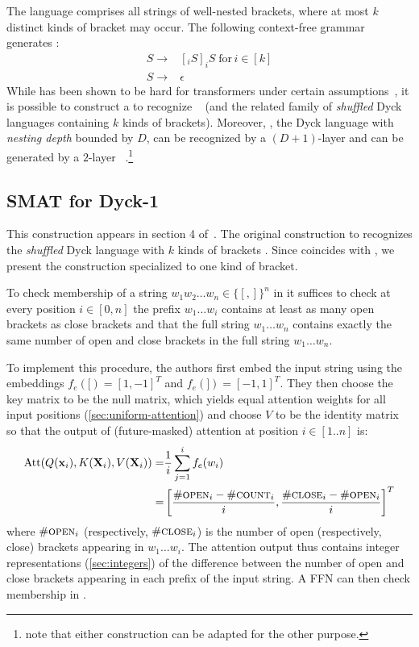 The language  comprises all strings of well-nested brackets, where at most $k$ distinct kinds of bracket may occur. The following context-free grammar generates :\begin{align*}
    S \rightarrow & [_i S]_iS \; \text{for}\, i \in [k]\\
    S \rightarrow & \epsilon
\end{align*}
While  has been shown to be hard for transformers under certain assumptions~\citep{hahn-2020-theoretical,bhattamishra2020ability}, it is possible to construct a \SMAT{} to recognize ~\citet{bhattamishra2020ability} (and the related family of \textit{shuffled} Dyck languages containing $k$ kinds of brackets). Moreover, , the Dyck language with \textit{nesting depth} bounded by $D$, can be recognized by a $(D+1)$-layer \UHAT{} and can be generated by a $2$-layer ~\citep{yao-2021-self-attention}.\footnote{\citet{yao-2021-self-attention} note that either construction can be adapted for the other purpose.}

\subsection{SMAT for Dyck-1}
This construction appears in section 4 of~\citet{bhattamishra2020ability}. The original construction to recognizes the \textit{shuffled} Dyck language with $k$ kinds of brackets . Since  coincides with , we present the construction specialized to one kind of bracket.

To check membership of a string $w_1w_2\ldots w_{n} \in \{[,] \}^n$ in  it suffices to check at every position $i \in [0,n]$ the prefix $w_1 \ldots w_i$ contains at least as many open brackets as close brackets and that the full string $w_1 \ldots w_n$ contains exactly the same number of open and close brackets in the full string $w_1\ldots w_n$.

To implement this procedure, the authors first embed the input string using the embeddings $f_e([) = [1,-1]^T$ and $f_e(]) = [-1,1]^T$. They then choose the key matrix to be the null matrix, which yields equal attention weights for all input positions (\cref{sec:uniform-attention}) and choose $V$ to be the identity matrix so that the output of (future-masked) attention at position $i \in [1..n]$ is:\begin{align*}
    \mathrm{Att}(Q(\mathbf{x}_i), K(\mathbf{X}_i), V(\mathbf{X}_i)) = & \frac{1}{i}\sum_{j=1}^i f_e(w_i)\\
    = & \left[ \frac{{\#}\textsc{open}_i - {\#}\textsc{count}_i}{i}, \frac{{\#}\textsc{close}_i - {\#}\textsc{open}_i}{i}\right]^T
\end{align*}
where ${\#}\textsc{open}_i$ (respectively, ${\#}\textsc{close}_i$) is the number of open (respectively, close) brackets appearing in $w_1\ldots w_i$. The attention output thus contains integer representations (\cref{sec:integers}) of the difference between the number of open and close brackets appearing in each prefix of the input string. A FFN can then check membership in .

